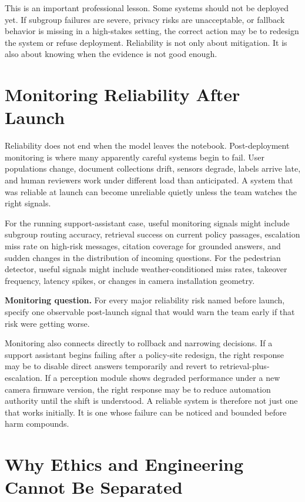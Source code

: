 This is an important professional lesson. Some systems should not be deployed yet. If subgroup failures are severe, privacy risks are unacceptable, or fallback behavior is missing in a high-stakes setting, the correct action may be to redesign the system or refuse deployment. Reliability is not only about mitigation. It is also about knowing when the evidence is not good enough.

\section{Monitoring Reliability After Launch}

Reliability does not end when the model leaves the notebook. Post-deployment monitoring is where many apparently careful systems begin to fail. User populations change, document collections drift, sensors degrade, labels arrive late, and human reviewers work under different load than anticipated. A system that was reliable at launch can become unreliable quietly unless the team watches the right signals.

For the running support-assistant case, useful monitoring signals might include subgroup routing accuracy, retrieval success on current policy passages, escalation miss rate on high-risk messages, citation coverage for grounded answers, and sudden changes in the distribution of incoming questions. For the pedestrian detector, useful signals might include weather-conditioned miss rates, takeover frequency, latency spikes, or changes in camera installation geometry.

\begin{thinkingtool}
\textbf{Monitoring question.} For every major reliability risk named before launch, specify one observable post-launch signal that would warn the team early if that risk were getting worse.
\end{thinkingtool}

Monitoring also connects directly to rollback and narrowing decisions. If a support assistant begins failing after a policy-site redesign, the right response may be to disable direct answers temporarily and revert to retrieval-plus-escalation. If a perception module shows degraded performance under a new camera firmware version, the right response may be to reduce automation authority until the shift is understood. A reliable system is therefore not just one that works initially. It is one whose failure can be noticed and bounded before harm compounds.

\section{Why Ethics and Engineering Cannot Be Separated}

